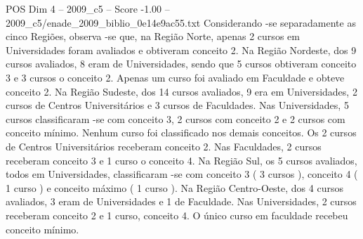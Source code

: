 \begin{textsample}{POS Dim 4 – 2009\_c5 – Score -1.00 – 2009\_c5/enade\_2009\_biblio\_0e14e9ac55.txt}
Considerando -se separadamente as cinco Regiões, observa -se que, na Região Norte, apenas 2 cursos em Universidades foram avaliados e obtiveram conceito 2.
Na Região Nordeste, dos 9 cursos avaliados, 8 eram de Universidades, sendo que 5 cursos obtiveram conceito 3 e 3 cursos o conceito 2.
Apenas um curso foi avaliado em Faculdade e obteve conceito 2.
Na Região Sudeste, dos 14 cursos avaliados, 9 era em Universidades, 2 cursos de Centros Universitários e 3 cursos de Faculdades.
Nas Universidades, 5 cursos classificaram -se com conceito 3, 2 cursos com conceito 2 e 2 cursos com conceito mínimo.
Nenhum curso foi classificado nos demais conceitos.
Os 2 cursos de Centros Universitários receberam conceito 2.
Nas Faculdades, 2 cursos receberam conceito 3 e 1 curso o conceito 4.
Na Região Sul, os 5 cursos avaliados, todos em Universidades, classificaram -se com conceito 3 ( 3 cursos ), conceito 4 ( 1 curso ) e conceito máximo ( 1 curso ).
Na Região Centro-Oeste, dos 4 cursos avaliados, 3 eram de Universidades e 1 de Faculdade.
Nas Universidades, 2 cursos receberam conceito 2 e 1 curso, conceito 4.
O único curso em faculdade recebeu conceito mínimo.

\end{textsample}
